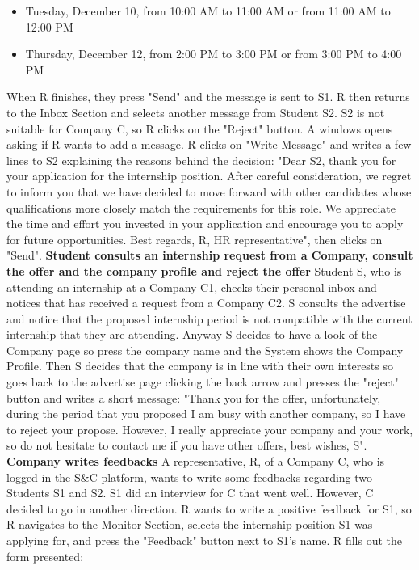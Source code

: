 \begin{itemize}
    \item Tuesday, December 10, from 10:00 AM to 11:00 AM or from 11:00 AM to 12:00 PM
    \item Thursday, December 12, from 2:00 PM to 3:00 PM or from 3:00 PM to 4:00 PM
\end{itemize}
When R finishes, they press "Send" and the message is sent to S1. 
R then returns to the Inbox Section and selects another message from Student S2. S2 is not suitable for Company C, so R clicks on the "Reject" button. A windows opens asking if R wants to add a message. R clicks on "Write Message" and writes a few lines to S2 explaining the reasons behind the decision: "Dear S2, thank you for your application for the internship position. After careful consideration, we regret to inform you that we have decided to move forward with other candidates whose qualifications more closely match the requirements for this role. We appreciate the time and effort you invested in your application and encourage you to apply for future opportunities.
Best regards,
R, HR representative", then clicks on "Send".
\newline\newline
\textbf{Student consults an internship request from a Company, consult the offer and the company profile and reject the offer}
\newline
Student S, who is attending an internship at a Company C1, checks their personal inbox and notices that has received a request from a Company C2. S consults the advertise and notice that the proposed internship period is not compatible with the current internship that they are attending. Anyway S decides to have a look of the Company page so press the company name and the System shows the Company Profile. Then S decides that the company is in line with their own interests so goes back to the advertise page clicking the back arrow and presses the "reject" button and writes a short message: "Thank you for the offer, unfortunately, during the period that you proposed I am busy with another company, so I have to reject your propose. However, I really appreciate your company and your work, so do not hesitate to contact me if you have other offers, best wishes, S".
\newline\newline
\textbf{Company writes feedbacks}
\newline
A representative, R, of a Company C, who is logged in the S\&C platform, wants to write some feedbacks regarding two Students S1 and S2. S1 did an interview for C that went well. However, C decided to go in another direction. R wants to write a positive feedback for S1, so R navigates to the Monitor Section, selects the internship position S1 was applying for, and press the "Feedback" button next to S1's name. R fills out the form presented:
